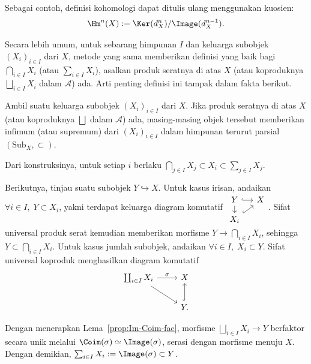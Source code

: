 Sebagai contoh, definisi kohomologi dapat ditulis ulang menggunakan kuosien:
\[ \Hm^n(X) := \Ker(d_X^n)/\Image(d_X^{n-1}). \]

Secara lebih umum, untuk sebarang himpunan $I$ dan keluarga subobjek
$(X_i)_{i\in I}$ dari $X$, metode yang sama memberikan definisi yang baik
bagi $\bigcap_{i\in I}X_i$ (atau $\sum_{i\in I}X_i$), asalkan produk seratnya
di atas $X$ (atau koproduknya $\bigsqcup_{i\in I}X_i$ dalam $\mathcal{A}$)
ada. Arti penting definisi ini tampak dalam fakta berikut.

\begin{proposisi}\label{prop:subobject-inf-sup}
	Ambil suatu keluarga subobjek $(X_i)_{i\in I}$ dari $X$. Jika produk
	seratnya di atas $X$ (atau koproduknya $\bigsqcup$ dalam $\mathcal{A}$)
	ada, masing-masing objek tersebut memberikan infimum (atau supremum) dari
	$(X_i)_{i\in I}$ dalam himpunan terurut parsial
	$(\mathrm{Sub}_X,\subset)$.
\end{proposisi}
\begin{bukti}
	Dari konstruksinya, untuk setiap $i$ berlaku
	$\bigcap_{j\in I}X_j\subset X_i\subset\sum_{j\in I}X_j$.

	Berikutnya, tinjau suatu subobjek $Y\hookrightarrow X$. Untuk kasus irisan,
	andaikan $\forall i\in I,\;Y\subset X_i$, yakni terdapat keluarga diagram
	komutatif
	$\begin{tikzcd}[row sep=small, column sep=small]
		Y \arrow[hookrightarrow, r] \arrow[d] & X \\
		X_i \arrow[hookrightarrow, ru] &
	\end{tikzcd}$.
	Sifat universal produk serat kemudian memberikan morfisme
	$Y\to\bigcap_{i\in I}X_i$, sehingga
	$Y\subset\bigcap_{i\in I}X_i$. Untuk kasus jumlah subobjek, andaikan
	$\forall i\in I,\;X_i\subset Y$. Sifat universal koproduk menghasilkan
	diagram komutatif
	\[\begin{tikzcd}
		\coprod_{i \in I} X_i \arrow[r, "\sigma"] \arrow[rd] & X \\
		& Y \arrow[hookrightarrow, u].
	\end{tikzcd}\]

	Dengan menerapkan Lema~\ref{prop:Im-Coim-fac}, morfisme
	$\bigsqcup_{i\in I}X_i\to Y$ berfaktor secara unik melalui
	$\Coim(\sigma)\simeq\Image(\sigma)$, serasi dengan morfisme menuju $X$.
	Dengan demikian,
	$\sum_{i\in I}X_i:=\Image(\sigma)\subset Y$.
\end{bukti}

